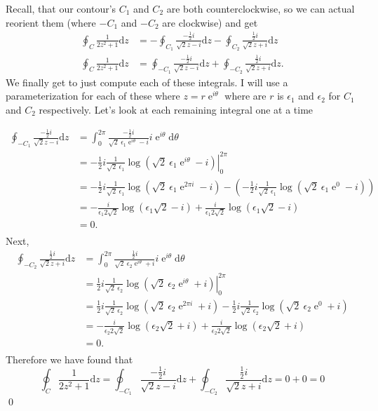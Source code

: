 \documentclass[10pt]{amsart}
\newcommand{\D}{\mathrm{d}}
\DeclareMathOperator{\E}{e}
\theoremstyle{nonumberplain}
\begin{document}
\begin{enumerate}[label={\bf {\arabic*}:}]
Recall, that our contour's $C_1$ and $C_2$ are both counterclockwise, so we can actual reorient them (where $-C_1$ and $-C_2$ are clockwise) and get
\begin{align*}
\oint_C \frac{1}{2z^2 + 1} \D z &= - \oint_{C_1} \frac{-\frac1 2 i}{\sqrt{2}z - i}  \D z
	- \oint_{C_2} \frac{\frac1 2 i}{\sqrt{2}z + i} \D z \\
\oint_C \frac{1}{2z^2 + 1} \D z &= \oint_{-C_1} \frac{-\frac1 2 i}{\sqrt{2}z - i}  \D z
	+ \oint_{-C_2} \frac{\frac1 2 i}{\sqrt{2}z + i} \D z.
\end{align*}
We finally get to just compute each of these integrals.
I will use a parameterization for each of these where $ z= r\E^{i\theta}$ where are $r$ is $\epsilon_1$ and $\epsilon_2$ for $C_1$ and $C_2$ respectively. Let's look at each remaining integral one at a time

\begin{align*}
\oint_{-C_1} \frac{-\frac1 2 i}{\sqrt{2}z - i}  \D z
	&= \int_{0}^{2\pi} \frac{-\frac1 2 i}{\sqrt{2}\:\epsilon_1\E^{i\theta} - i} i\E^{i\theta}\D \theta \\
	&= \left. -\frac1 2 i \frac{1}{\sqrt{2}\:\epsilon_1} \log\left(\sqrt{2}\:\epsilon_1\E^{i\theta} - i\right) \right|_{0}^{2\pi} \\
	&= -\frac1 2 i \frac{1}{\sqrt{2}\:\epsilon_1} \log\left(\sqrt{2}\:\epsilon_1\E^{2\pi i} - i\right)
	- \left(-\frac1 2 i \frac{1}{\sqrt{2}\:\epsilon_1} \log\left(\sqrt{2}\:\epsilon_1\E^{0} - i\right) \right) \\
	&= -\frac i {\epsilon_1 2 \sqrt{2}} \log\left(\epsilon_1\sqrt{2} - i\right)
	+ \frac i {\epsilon_1 2 \sqrt{2}} \log\left(\epsilon_1\sqrt{2} - i\right) \\
	&= 0. \\
\end{align*}
Next,
\begin{align*}
\oint_{-C_2} \frac{\frac1 2 i}{\sqrt{2}z + i}  \D z
	&= \int_{0}^{2\pi} \frac{\frac1 2 i}{\sqrt{2}\:\epsilon_2\E^{i\theta} + i} i\E^{i\theta}\D \theta \\
	&= \left. \frac1 2 i \frac{1}{\sqrt{2}\:\epsilon_2} \log\left(\sqrt{2}\:\epsilon_2\E^{i\theta} + i\right) \right|_{0}^{2\pi} \\
	&= \frac1 2 i \frac{1}{\sqrt{2}\:\epsilon_2} \log\left(\sqrt{2}\:\epsilon_2\E^{2\pi i} + i\right)
	- \frac1 2 i \frac{1}{\sqrt{2}\:\epsilon_2} \log\left(\sqrt{2}\:\epsilon_2\E^{0} + i\right)  \\
	&= -\frac i {\epsilon_2 2 \sqrt{2}} \log\left(\epsilon_2\sqrt{2} + i\right)
	+ \frac i {\epsilon_2 2 \sqrt{2}} \log\left(\epsilon_2\sqrt{2} + i\right) \\
	&= 0. \\
\end{align*}
Therefore we have found that 
$$
\oint_C \frac{1}{2z^2 + 1} \D z = \oint_{-C_1} \frac{-\frac1 2 i}{\sqrt{2}z - i}  \D z + \oint_{-C_2} \frac{\frac1 2 i}{\sqrt{2}z + i} \D z = 0 + 0 = 0
$$
\qed
\\


\end{enumerate}
\end{document}
